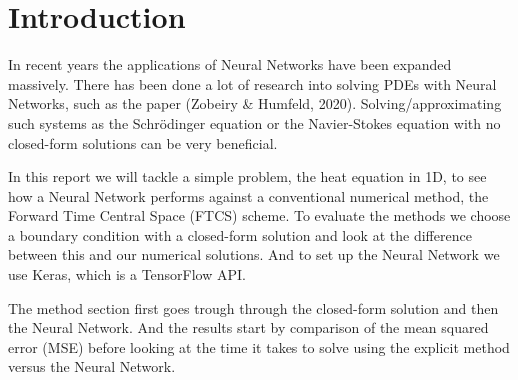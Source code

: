 \section{Introduction}
\begin{comment}
In this report we will look at ...
Motivate the reader, the first part of the introduction gives always a
motivation and tries to give the overarching ideas. What I have done. 
The structure of the report, how it is organised. Explain structure of the rapport at the end of intro. 
\end{comment}

In recent years the applications of Neural Networks have been expanded
massively. There has been done a lot of research into solving PDEs with Neural
Networks, such as the paper (Zobeiry \& Humfeld, 2020)\cite{2}.
Solving/approximating such
systems as the Schrödinger equation or the Navier-Stokes equation with no
closed-form solutions can be very beneficial. 

In this report we will tackle a simple problem, the heat equation in 1D, to see how a Neural Network
performs against a conventional numerical method, the Forward Time Central
Space (FTCS) scheme. To evaluate the methods we choose a boundary condition with a closed-form
solution and look at the difference between this and our numerical solutions.
And to set up the Neural Network we use Keras, which is a TensorFlow API.


The method section first goes trough through the closed-form solution and then
the Neural Network. And the results start by comparison of the mean squared
error (MSE) before looking at the time it takes to solve using the explicit
method versus the Neural Network.


